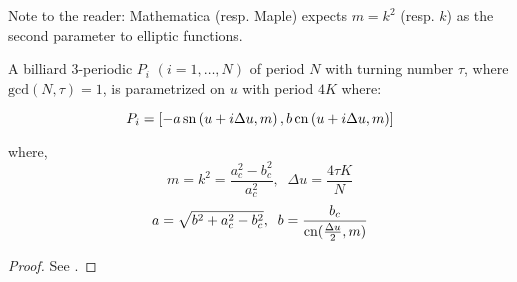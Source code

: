 \begin{remark}
Note to the reader: Mathematica (resp. Maple) expects $m=k^2$ (resp. $k$) as the second parameter to elliptic functions.




\end{remark}

\begin{theorem}
A billiard 3-periodic $P_i$ $(i=1,\ldots, N) $ of period $N$  with turning number $\tau$, where $\mathrm{gcd}(N,\tau) =1$,  is parametrized on $u$ with period $4K$ where:


\[ 
P_i=
\left[-a\,\mathrm{sn}  \left(u+ i \Delta{u},  {m} \right) , b\,\mathrm{cn}  \left(u + i \Delta{u}, { m} \right)\right]
\]

where,
\[ m=k^2=\frac{a_c^2-b_c^2}{a_c^2},\;\;\Delta{u}=\frac{4\tau K}{N}\]
\[a= \sqrt{b^2+ a_c^2-b_c^2}, \;\; b=\frac{b_c}{\mathrm{cn}(\frac{\Delta{u}}{2}, m)}\]
\end{theorem}
\begin{proof} See \cite{stachel2021-billiards}.\end{proof}


